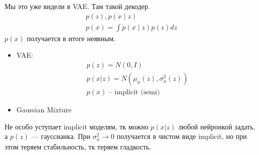 \documentclass{book}
\begin{document}
\begin{enumerate}
   Мы это уже видели в VAE. Там такой декодер.
   \begin{gather*}
     p(z), p(x\mid z)\\
     p(x)=\int {p(x\mid z)p(z)dz}
   \end{gather*}
   $p(x)$ получается в итоге неявным.

   \begin{itemize}
     \item VAE:
     \begin{gather*}
       p(z)=N(0,I)\\
       p(x|z)=N(\mu_\phi(z), \sigma_\phi^2(z))\\
       p(x) \textrm{ -- implicit (semi)}
     \end{gather*}
     \item Gaussian Mixture
   \end{itemize}

   Не особо уступает implicit моделям, тк можно $p(x|z)$ любой нейронкой задать, а $p(z)$ --- гауссианка. При $\sigma_\phi^2 \rightarrow 0$ получается в чистом виде implicit, но при этом теряем стабильность, тк теряем гладкость.
\end{enumerate}
\end{document}
